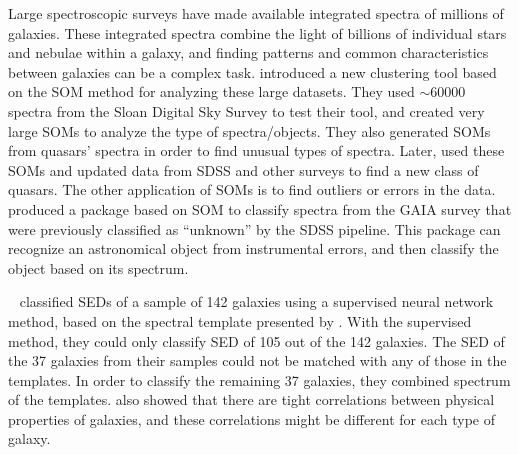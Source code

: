Large spectroscopic surveys have made available integrated spectra of millions of galaxies.
These integrated spectra combine the light of billions of individual stars and nebulae within a galaxy, and
finding patterns and common characteristics between galaxies can be a complex task.
\citet{In12} introduced a new clustering tool based on the SOM method for analyzing these large datasets.
They used $\sim 60000$ spectra from the Sloan Digital Sky Survey \citep[SDSS;][]{Abazajian09} to test their tool, and created very large SOMs to analyze the type of spectra/objects.
They also generated SOMs from quasars' spectra in order to find unusual types of spectra. 
Later, \citet{Meusinger16} used these SOMs and updated data from SDSS and other surveys to find a new class of quasars.
The other application of SOMs is to find outliers or errors in the data.
\citet{Fustes13} produced a package based on SOM to classify spectra from the GAIA survey that were previously classified as ``unknown'' by the SDSS pipeline. This package can recognize an astronomical object from instrumental errors, and then classify the object based on its spectrum.

~\citet[][hereafter ]{Hossein12} classified SEDs of a sample of 142 galaxies using a supervised neural network method, based on the spectral template presented by .
With the supervised method, they could only classify SED of 105 out of the 142 galaxies.
The SED of the 37 galaxies from their samples could not be matched with any of those in the  templates. 
In order to classify the remaining 37 galaxies, they combined spectrum of the  templates.
 also showed that there are tight correlations between physical properties of galaxies, and these correlations might be different for each type of galaxy.

